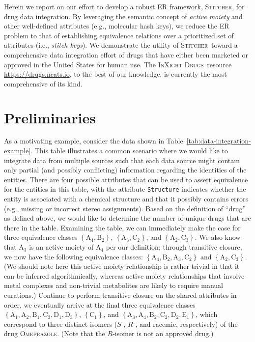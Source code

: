 \documentclass{bmcart}
\newcommand\st{\textsc{Stitcher}}
\newcommand\ix{\textsc{InXight Drugs}}
\begin{document}
Herein we report on our effort to develop a robust ER framework, \st,
for drug data integration. By leveraging the semantic concept of
\emph{active moiety} and other well-defined attributes (e.g.,
molecular hash keys), we reduce the ER problem to that of establishing
equivalence relations over a prioritized set of attributes (i.e.,
\emph{stitch keys}). We demonstrate the utility of \st\ toward a
comprehensive data integration effort of drugs that have either
been marketed or approved in the United States for human use. The
\ix\ resource \url{https://drugs.ncats.io}, to the best of our
knowledge, is currently the most comprehensive of its kind.

\section*{Preliminaries}
As a motivating example, consider the data shown in
Table~\ref{tab:data-integration-example}. This table illustrates a
common scenario where we would like to integrate data from multiple
sources such that each data source might contain only partial (and
possibly conflicting) information regarding the identities of the
entities. There are four possible attributes that can be used to assert
equivalence for the entities in this table, with the attribute
\verb|Structure| indicates whether the entity is associated with a
chemical structure and that it possibly contains errors (e.g., missing
or incorrect stereo assignments). Based on the definition of
``drug'' as defined above, we would like to determine the number of
unique drugs that are there in the table. Examining the table, we can
immediately make the case for three equivalence classes $\left\{\textrm{A}_4,
\textrm{B}_2\right\}$, $\left\{\textrm{A}_3, \textrm{C}_2\right\}$,
and $\left\{\textrm{A}_2, \textrm{C}_3\right\}$. We also know that
$\textrm{A}_3$ is an active moiety of $\textrm{A}_4$ per our
definition; through transitive closure, we now have the following
equivalence classes: $\left\{\textrm{A}_4, 
\textrm{B}_2, \textrm{A}_3, \textrm{C}_2\right\}$ and
$\left\{\textrm{A}_2,  \textrm{C}_3\right\}$. (We should note here
this active moiety relationship is rather trivial in that it can
be inferred algorithmically, whereas active moiety relationships that
involve metal complexes and non-trivial metabolites are likely to
require manual curations.) Continue to perform transitive closure on
the shared attributes in order, we eventually arrive at the final three
equivalence classes $\left\{\textrm{A}_1, \textrm{A}_2, \textrm{B}_1,
\textrm{C}_3, \textrm{D}_1, \textrm{D}_3\right\}$,
$\left\{\textrm{C}_1\right\}$, and $\left\{\textrm{A}_3, \textrm{A}_4,
\textrm{B}_2, \textrm{C}_2, \textrm{D}_2, \textrm{E}_1\right\}$, which
correspond to three distinct isomers ($S$-, $R$-, and racemic,
respectively) of the drug \textsc{Omeprazole}. (Note that the
$R$-isomer is not an approved drug.)
\end{document}
